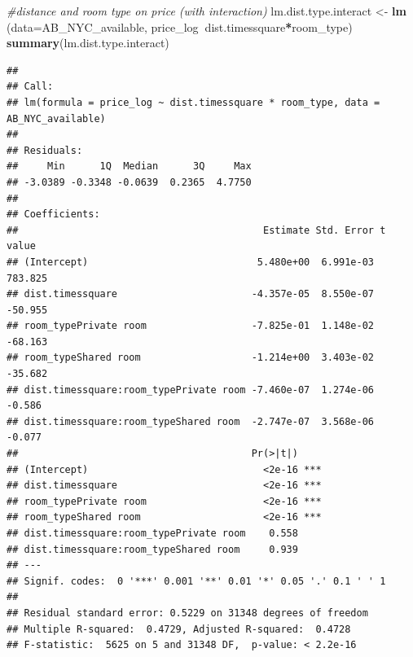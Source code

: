 \documentclass[]{article}
\newenvironment{Shaded}{\begin{snugshade}}{\end{snugshade}}
\newcommand{\CommentTok}[1]{\textcolor[rgb]{0.56,0.35,0.01}{\textit{#1}}}
\newcommand{\DataTypeTok}[1]{\textcolor[rgb]{0.13,0.29,0.53}{#1}}
\newcommand{\DecValTok}[1]{\textcolor[rgb]{0.00,0.00,0.81}{#1}}
\newcommand{\FloatTok}[1]{\textcolor[rgb]{0.00,0.00,0.81}{#1}}
\newcommand{\KeywordTok}[1]{\textcolor[rgb]{0.13,0.29,0.53}{\textbf{#1}}}
\newcommand{\NormalTok}[1]{#1}
\newcommand{\OperatorTok}[1]{\textcolor[rgb]{0.81,0.36,0.00}{\textbf{#1}}}
\newcommand{\StringTok}[1]{\textcolor[rgb]{0.31,0.60,0.02}{#1}}
\begin{document}
\begin{Shaded}
\begin{Highlighting}[]
\CommentTok{#distance and room type on price (with interaction)}
\NormalTok{lm.dist.type.interact <-}\StringTok{ }\KeywordTok{lm}\NormalTok{ (}\DataTypeTok{data=}\NormalTok{AB_NYC_available, price_log}\OperatorTok{~}\NormalTok{dist.timessquare}\OperatorTok{*}\NormalTok{room_type)}
\KeywordTok{summary}\NormalTok{(lm.dist.type.interact)}
\end{Highlighting}
\end{Shaded}

\begin{verbatim}
## 
## Call:
## lm(formula = price_log ~ dist.timessquare * room_type, data = AB_NYC_available)
## 
## Residuals:
##     Min      1Q  Median      3Q     Max 
## -3.0389 -0.3348 -0.0639  0.2365  4.7750 
## 
## Coefficients:
##                                          Estimate Std. Error t value
## (Intercept)                             5.480e+00  6.991e-03 783.825
## dist.timessquare                       -4.357e-05  8.550e-07 -50.955
## room_typePrivate room                  -7.825e-01  1.148e-02 -68.163
## room_typeShared room                   -1.214e+00  3.403e-02 -35.682
## dist.timessquare:room_typePrivate room -7.460e-07  1.274e-06  -0.586
## dist.timessquare:room_typeShared room  -2.747e-07  3.568e-06  -0.077
##                                        Pr(>|t|)    
## (Intercept)                              <2e-16 ***
## dist.timessquare                         <2e-16 ***
## room_typePrivate room                    <2e-16 ***
## room_typeShared room                     <2e-16 ***
## dist.timessquare:room_typePrivate room    0.558    
## dist.timessquare:room_typeShared room     0.939    
## ---
## Signif. codes:  0 '***' 0.001 '**' 0.01 '*' 0.05 '.' 0.1 ' ' 1
## 
## Residual standard error: 0.5229 on 31348 degrees of freedom
## Multiple R-squared:  0.4729, Adjusted R-squared:  0.4728 
## F-statistic:  5625 on 5 and 31348 DF,  p-value: < 2.2e-16
\end{verbatim}

\begin{Shaded}
\end{Shaded}
\end{document}
